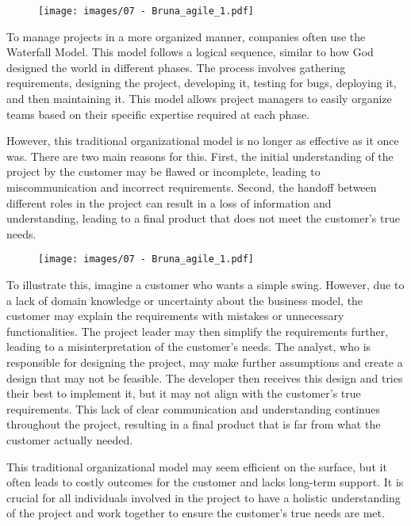 \begin{figure}[!h]
    \centering
    \texttt{[image: images/07 - Bruna\_agile\_1.pdf]}
\end{figure}

To manage projects in a more organized manner, companies often use the
Waterfall Model. This model follows a logical sequence, similar to how
God designed the world in different phases. The process involves
gathering requirements, designing the project, developing it, testing
for bugs, deploying it, and then maintaining it. This model allows
project managers to easily organize teams based on their specific
expertise required at each phase.

However, this traditional organizational model is no longer as effective
as it once was. There are two main reasons for this. First, the initial
understanding of the project by the customer may be flawed or
incomplete, leading to miscommunication and incorrect requirements.
Second, the handoff between different roles in the project can result in
a loss of information and understanding, leading to a final product that
does not meet the customer's true needs.

\begin{figure}[!h]
    \centering
    \texttt{[image: images/07 - Bruna\_agile\_1.pdf]}
\end{figure}

To illustrate this, imagine a customer who wants a simple swing.
However, due to a lack of domain knowledge or uncertainty about the
business model, the customer may explain the requirements with mistakes
or unnecessary functionalities. The project leader may then simplify the
requirements further, leading to a misinterpretation of the customer's
needs. The analyst, who is responsible for designing the project, may
make further assumptions and create a design that may not be feasible.
The developer then receives this design and tries their best to
implement it, but it may not align with the customer's true
requirements. This lack of clear communication and understanding
continues throughout the project, resulting in a final product that is
far from what the customer actually needed.

This traditional organizational model may seem efficient on the surface,
but it often leads to costly outcomes for the customer and lacks
long-term support. It is crucial for all individuals involved in the
project to have a holistic understanding of the project and work
together to ensure the customer's true needs are met.

